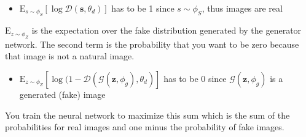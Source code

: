 \begin{itemize}
    \item $\mathrm{E}_{s \sim \phi_{S}} [\log \mathcal{D}\left(\boldsymbol{s}, \theta_{d}\right)] $ has to be 1 since $s \sim \phi_S$, thus images are real
\end{itemize}{}
$\mathrm{E}_{z \sim \phi_{Z}}$ is the expectation over the fake distribution generated by the generator network. The second term is the probability that you want to be zero because that image is not a natural image. 
\begin{itemize}
    \item $\mathrm{E}_{z \sim \phi_{Z}} [\log ( 1 -  \mathcal{D}\left(\mathcal{G} (\boldsymbol{z}, \phi_g), \theta_{d}\right)] $ has to be 0 since $\mathcal{G} (\boldsymbol{z}, \phi_g)$ is a generated (fake) image
\end{itemize}{}
You train the neural network to maximize this sum which is the sum of the probabilities for real images and one minus the probability of fake images. \\

